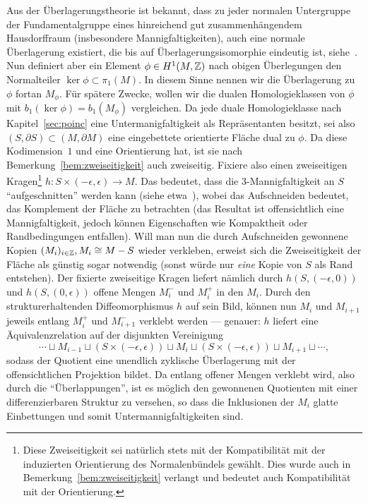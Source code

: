 \begin{constr}
	\label{constr:cut}
	Aus der Überlagerungstheorie ist bekannt, dass zu jeder normalen Untergruppe der Fundamentalgruppe eines hinreichend gut zusammenhängendem Hausdorffraum (insbesondere Mannigfaltigkeiten), auch eine normale Überlagerung existiert, die bis auf Überlagerungsisomorphie eindeutig ist, siehe~\cite[Chapter~1.3]{Hatcher.2002}. Nun definiert aber ein Element $\phi\in H^1(M,\mathbb{Z})$ nach obigen Überlegungen den Normalteiler $\ker\phi\subset \pi_1(M)$. In diesem Sinne nennen wir die Überlagerung zu $\phi$ fortan $M_\phi$. Für spätere Zwecke, wollen wir die dualen Homologieklassen von $\phi$ mit $b_1(\ker\phi)=b_1(M_\phi)$ vergleichen. Da jede duale Homologieklasse nach Kapitel~\ref{sec:poinc} eine Untermanigfaltigkeit als Repräsentanten besitzt, sei also $(S,\partial S) \subset (M,\partial M)$ eine eingebettete orientierte Fläche dual zu $\phi$. Da diese Kodimension~$1$ und eine Orientierung hat, ist sie nach Bemerkung~\ref{bem:zweiseitigkeit} auch zweiseitig. Fixiere also einen zweiseitigen Kragen\footnote{Diese Zweiseitigkeit sei natürlich stets mit der Kompatibilität mit der induzierten Orientierung des Normalenbündels gewählt. Dies wurde auch in Bemerkung~\ref{bem:zweiseitigkeit} verlangt und bedeutet auch Kompatibilität mit der Orientierung.} $h:S\times (-\epsilon,\epsilon) \to M$. Das bedeutet, dass die 3-Mannigfaltigkeit an $S$ "`aufgeschnitten"' werden kann (siehe etwa~\cite[Kapitel~4.2]{Burde.2003}), wobei das Aufschneiden bedeutet, das Komplement der Fläche zu betrachten (das Resultat ist offensichtlich eine Mannigfaltigkeit, jedoch können Eigenschaften wie Kompaktheit oder Randbedingungen entfallen). Will man nun die durch Aufschneiden gewonnene Kopien $(M_i)_{i\in \mathbb{Z}}, M_i \cong M-S$ wieder verkleben, erweist sich die Zweiseitigkeit der Fläche als günstig sogar notwendig (sonst würde nur \emph{eine} Kopie von $S$ als Rand entstehen). Der fixierte zweiseitige Kragen liefert nämlich durch $h(S,(-\epsilon,0))$ und $h(S,(0,\epsilon))$ offene Mengen $M_i^-$ und $M_i^+$ in den $M_i$. Durch den strukturerhaltenden Diffeomorphismus $h$ auf sein Bild, können nun $M_i$ und $M_{i+1}$ jeweils entlang $M_i^+$ und $M_{i+1}^-$ verklebt werden --- genauer: $h$ liefert eine Äquivalenzrelation auf der disjunkten Vereinigung 
	\[
		\cdots \sqcup M_{i-1} \sqcup (S \times (-\epsilon,\epsilon)) \sqcup M_i \sqcup  (S \times (-\epsilon,\epsilon)) \sqcup M_{i+1} \sqcup \cdots,
	\]
	sodass der Quotient eine unendlich zyklische Überlagerung mit der offensichtlichen Projektion bildet. Da entlang offener Mengen verklebt wird, also durch die "`Überlappungen"', ist es möglich den gewonnenen Quotienten mit einer differenzierbaren Struktur zu versehen, so dass die Inklusionen der $M_i$ glatte Einbettungen und somit Untermannigfaltigkeiten sind.


\end{constr}
